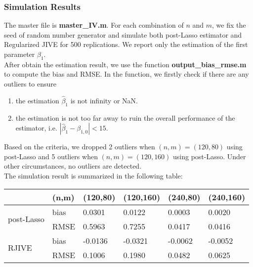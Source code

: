 \documentclass[12pt, a4paper]{article}
\begin{document}
\subsubsection*{Simulation Results}
The master file is \textbf{master\_IV.m}. For each combination of $n$ and $m$, we fix the seed of random number generator and simulate both post-Lasso estimator and Regularized JIVE for 500 replications. We report only the estimation of the first parameter $\beta_1$.\\
\noindent After obtain the estimation result, we use the function \textbf{output\_bias\_rmse.m} to compute the bias and RMSE. In the function, we firstly check if there are any outliers to ensure
\begin{enumerate}
	\item the estimation $\hat{\beta}_1$ is not infinity or NaN.
	\item the estimation is not too far away to ruin the overall performance of the estimator, i.e. $ |\hat{\beta}_1 - \beta_{1,0} | < 15$.
\end{enumerate}
Based on the criteria, we dropped 2 outliers when $(n,m) = (120,80)$ using post-Lasso and 5 outliers when $(n,m) = (120,160)$ using post-Lasso. Under other circumstances, no outliers are detected.\\

\noindent The simulation result is summarized in the following table:\\

\begin{tabular}{ |p{1.5cm}|p{1.8cm}|p{1.8cm}|p{1.8cm}|p{1.8cm}|p{1.8cm}|  }
	\hline
	&(n,m) & (120,80) & (120,160) & (240,80) & (240,160)\\
	\hline
	\multirow{2}{0pt}{post-Lasso} & bias & 0.0301 & 0.0122 &	0.0003 & 0.0020\\
	& RMSE & 0.5963 & 0.7255 & 0.0417 & 0.0416\\
	\hline
	\multirow{2}{0pt}{RJIVE} & bias & -0.0136 & -0.0321 & -0.0062 & -0.0052\\
	& RMSE & 0.1006 & 0.1980 & 0.0482 &	0.0625\\
	\hline
\end{tabular}

\newpage


\end{document}
